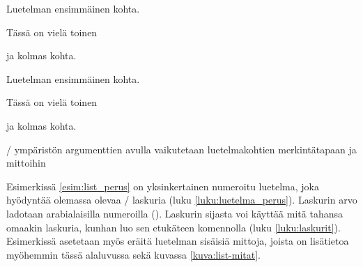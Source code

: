 \begin{esimerkki*}
\begin{koodilohko}
  \begin{list}{)}{
      \setlength{\leftmargin}{1.5em} %
      \setlength{\itemsep}{.2ex}     %
      \setlength{\parsep}{0ex}       %
    }
  \item Luetelman ensimmäinen kohta.
  \item Tässä on vielä toinen
  \item ja kolmas kohta.
  \end{list}
\end{koodilohko}
\begin{tulos}
  \begin{list}{)}{
      \setlength{\leftmargin}{1.5em} %
      \setlength{\itemsep}{.2ex}     %
      \setlength{\parsep}{0ex}       %
    }
  \item Luetelman ensimmäinen kohta.
  \item Tässä on vielä toinen
  \item ja kolmas kohta.
  \end{list}
\end{tulos}
\caption{\-/ ympäristön argumenttien avulla vaikutetaan
  luetelmakohtien merkintätapaan ja mittoihin}
\label{esim:list_perus}
\end{esimerkki*}

Esimerkissä \ref{esim:list_perus} on yksinkertainen numeroitu luetelma,
joka hyödyntää olemassa olevaa \-/ laskuria (luku
\ref{luku:luetelma_perus}). Laskurin arvo ladotaan arabialaisilla
numeroilla (). Laskurin  sijasta voi
käyttää mitä tahansa omaakin laskuria, kunhan luo sen etukäteen
komennolla  (luku \ref{luku:laskurit}). Esimerkissä
asetetaan myös eräitä luetelman sisäisiä mittoja, joista on lisätietoa
myöhemmin tässä alaluvussa sekä kuvassa \ref{kuva:list-mitat}.

